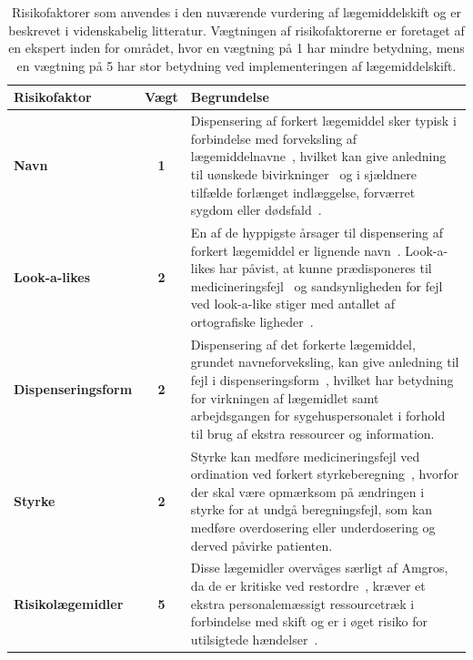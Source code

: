 \begin{longtable}{|l|c|p{9.2cm}|}
	\caption{Risikofaktorer som anvendes i den nuværende vurdering af lægemiddelskift og er beskrevet i videnskabelig litteratur. Vægtningen af risikofaktorerne er foretaget af en ekspert inden for området, hvor en vægtning på 1 har mindre betydning, mens en vægtning på 5 har stor betydning ved implementeringen af lægemiddelskift.} 
	\label{table:features} \\ \hline
\cellcolor[HTML]{C0C0C0} {\textbf{Risikofaktor}} & \cellcolor[HTML]{C0C0C0} {\textbf{Vægt}} & \cellcolor[HTML]{C0C0C0} {\textbf{Begrundelse}} \vspace{0.2cm} \\ \hline
\textbf{Navn} & \textbf{1} & Dispensering af forkert lægemiddel sker typisk i forbindelse med forveksling af lægemiddelnavne~\citep{DanskSelskabforPatientsikkerhed2009}, hvilket kan give anledning til uønskede bivirkninger~\citep{Basco2010} og i sjældnere tilfælde forlænget indlæggelse, forværret sygdom eller dødsfald~\citep{DanskSelskabforPatientsikkerhed2009}.  \\  \hline 
\textbf{Look-a-likes} & \textbf{2} & En af de hyppigste årsager til dispensering af forkert lægemiddel er lignende navn~\citep{Hakonsen2010}. Look-a-likes har påvist, at kunne prædisponeres til medicineringsfejl~\citep{Wittich2014} og sandsynligheden for fejl ved look-a-like stiger med antallet af ortografiske ligheder~\citep{Basco2010}. \\  \hline 
\textbf{Dispenseringsform} & \textbf{2} & Dispensering af det forkerte lægemiddel, grundet navneforveksling, kan give anledning til fejl i dispenseringsform~\citep{DanskSelskabforPatientsikkerhed2009, Agrawal2009}, hvilket har betydning for virkningen af lægemidlet samt arbejdsgangen for sygehuspersonalet i forhold til brug af ekstra ressourcer og information.
\\ \hline 
\textbf{Styrke} & \textbf{2} & Styrke kan medføre medicineringsfejl ved ordination ved forkert styrkeberegning~\citep{Agrawal2009}, hvorfor der skal være opmærksom på ændringen i styrke for at undgå beregningsfejl, som kan medføre overdosering eller underdosering og derved påvirke patienten.\\ \hline
\textbf{Risikolægemidler} & \textbf{5} & Disse lægemidler overvåges særligt af Amgros, da de er kritiske ved restordre~\citep{Amgros}, kræver et ekstra personalemæssigt ressourcetræk i forbindelse med skift og er i øget risiko for utilsigtede hændelser~\citep{Amgros}. \\ \hline 

\end{longtable}
